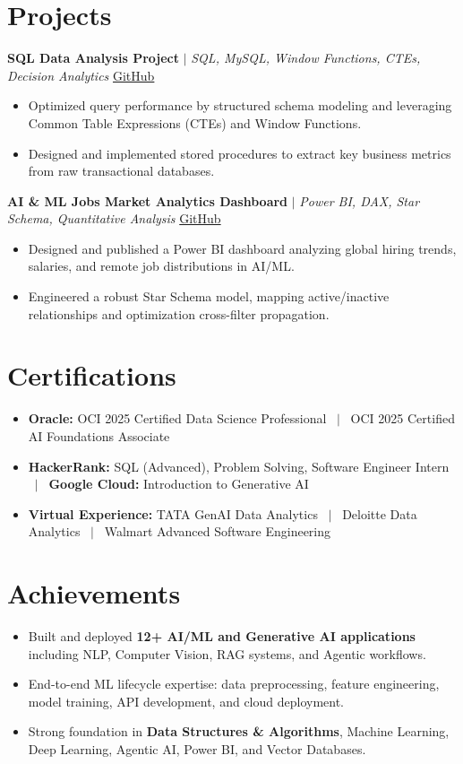 \documentclass[a4paper,9pt]{article}
\newcommand{\resumeItem}[1]{\item\small #1}
\begin{document}
\vspace{-2mm}

\section{Projects}

\noindent\textbf{SQL Data Analysis Project} $|$ \textit{SQL, MySQL, Window Functions, CTEs, Decision Analytics} \hfill
\href{https://github.com/hsachan295-source/smart-business-dashboard}{\small GitHub}
\begin{itemize}
\resumeItem{Optimized query performance by structured schema modeling and leveraging Common Table Expressions (CTEs) and Window Functions.}
\resumeItem{Designed and implemented stored procedures to extract key business metrics from raw transactional databases.}
\end{itemize}

\vspace{1.5pt}
\noindent\textbf{AI \& ML Jobs Market Analytics Dashboard} $|$ \textit{Power BI, DAX, Star Schema, Quantitative Analysis} \hfill
\href{https://github.com/hsachan295-source/Power-BI-Portfolio}{\small GitHub}
\begin{itemize}
\resumeItem{Designed and published a Power BI dashboard analyzing global hiring trends, salaries, and remote job distributions in AI/ML.}
\resumeItem{Engineered a robust Star Schema model, mapping active/inactive relationships and optimization cross-filter propagation.}
\end{itemize}


\vspace{-2mm}

\section{Certifications}
\begin{itemize}
\resumeItem{\textbf{Oracle:} OCI 2025 Certified Data Science Professional ~$|$~ OCI 2025 Certified AI Foundations Associate}
\resumeItem{\textbf{HackerRank:} SQL (Advanced), Problem Solving, Software Engineer Intern ~$|$~ \textbf{Google Cloud:} Introduction to Generative AI}
\resumeItem{\textbf{Virtual Experience:} TATA GenAI Data Analytics ~$|$~ Deloitte Data Analytics ~$|$~ Walmart Advanced Software Engineering}
\end{itemize}

\vspace{-2mm}

\section{Achievements}
\begin{itemize}
\resumeItem{Built and deployed \textbf{12+ AI/ML and Generative AI applications} including NLP, Computer Vision, RAG systems, and Agentic workflows.}
\resumeItem{End-to-end ML lifecycle expertise: data preprocessing, feature engineering, model training, API development, and cloud deployment.}
\resumeItem{Strong foundation in \textbf{Data Structures \& Algorithms}, Machine Learning, Deep Learning, Agentic AI, Power BI, and Vector Databases.}
\end{itemize}
\end{document}
